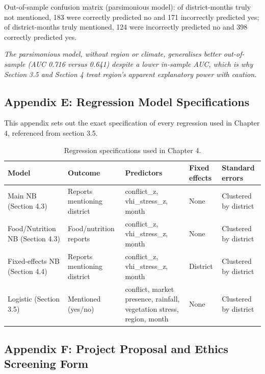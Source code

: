\documentclass[12pt,a4paper]{article}
\begin{document}
\noindent Out-of-sample confusion matrix (parsimonious model): of district-months truly not mentioned, 183 were correctly predicted no and 171 incorrectly predicted yes; of district-months truly mentioned, 124 were incorrectly predicted no and 398 correctly predicted yes.

\textit{The parsimonious model, without region or climate, generalises better out-of-sample (AUC 0.716 versus 0.641) despite a lower in-sample AUC, which is why Section 3.5 and Section 4 treat region's apparent explanatory power with caution.}

\subsection*{Appendix E: Regression Model Specifications}

This appendix sets out the exact specification of every regression used in Chapter 4, referenced from section 3.5.

\begingroup
\setlength{\intextsep}{0pt}
\setlength{\floatsep}{0pt}
\setlength{\textfloatsep}{0pt}
\setlength{\abovecaptionskip}{6pt}
\setlength{\belowcaptionskip}{6pt}
\begin{table}[h!]
\centering
\begin{tabular}{p{2.9cm}p{2.7cm}p{4.3cm}p{1.4cm}p{2.5cm}}
\toprule
\textbf{Model} & \textbf{Outcome} & \textbf{Predictors} & \textbf{Fixed effects} & \textbf{Standard errors} \\
\midrule
Main NB (Section 4.3) & Reports mentioning district & conflict\_z, vhi\_stress\_z, month & None & Clustered by district \\
Food/Nutrition NB (Section 4.3) & Food/nutrition reports & conflict\_z, vhi\_stress\_z, month & None & Clustered by district \\
Fixed-effects NB (Section 4.4) & Reports mentioning district & conflict\_z, vhi\_stress\_z, month & District & Clustered by district \\
Logistic (Section 3.5) & Mentioned (yes/no) & conflict, market presence, rainfall, vegetation stress, region, month & None & Clustered by district \\
\bottomrule
\end{tabular}
\caption{Regression specifications used in Chapter 4.}
\label{tab:modelspecs}
\end{table}
\endgroup

\subsection*{Appendix F: Project Proposal and Ethics Screening Form}
\end{document}
